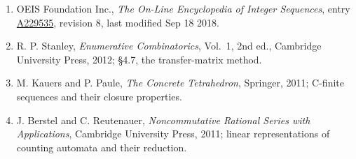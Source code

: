 \documentclass[11pt]{article}
\theoremstyle{definition}
\begin{document}
\begin{enumerate}

\item OEIS Foundation Inc., \emph{The On-Line Encyclopedia of Integer Sequences}, entry \href{https://oeis.org/A229535}{A229535}, revision 8, last modified Sep 18 2018.

\item R. P. Stanley, \emph{Enumerative Combinatorics}, Vol.~1, 2nd ed., Cambridge University Press, 2012; \S4.7, the transfer-matrix method.

\item M. Kauers and P. Paule, \emph{The Concrete Tetrahedron}, Springer, 2011; C-finite sequences and their closure properties.

\item J. Berstel and C. Reutenauer, \emph{Noncommutative Rational Series with Applications}, Cambridge University Press, 2011; linear representations of counting automata and their reduction.

\end{enumerate}
\end{document}

